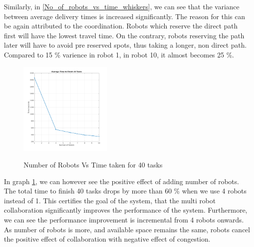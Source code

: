 \documentclass[journal]{IEEEtran}
\begin{document}
Similarly, in \ref{No_of_robots_vs_time_whiskers}, we can see that the variance between average delivery times is increased significantly. The reason for this can be again attributed to the coordination. Robots which reserve the direct path first will have the lowest travel time. On the contrary, robots reserving the path later will have to avoid pre reserved spots, thus taking a longer, non direct path. Compared to 15 \% varience in robot 1,  in robot 10, it almost becomes 25 \%.  

\begin{figure}[h]
\includegraphics[width=0.40\textwidth]{resources/graphs/graph6.png}
\label{No_of_robots_vs_average_time_all_taks}
\caption{Number of Robots Vs Time taken for 40 tasks}
\end{figure}

In graph \ref{No_of_robots_vs_average_time_all_taks}, we can however see the positive effect of adding number of robots. The total time to finish 40 tasks drops by more than 60 \% when we use 4 robots instead of 1. This certifies the goal of the system, that the multi robot collaboration significantly improves the performance of the system. Furthermore, we can see the performance improvement is incremental from 4 robots onwards. As number of robots is more, and available space remains the same, robots cancel the positive effect of collaboration with negative effect of congestion.










\end{document}
